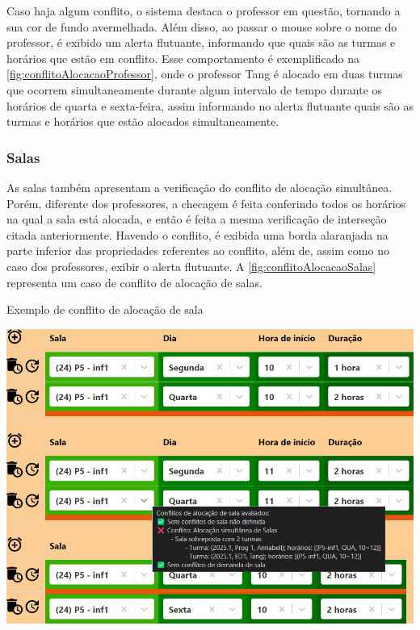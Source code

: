 Caso haja algum conflito, o sistema destaca o professor em questão, tornando a sua cor de fundo avermelhada. Além disso, ao passar o mouse sobre o nome do professor, é exibido um alerta flutuante, informando que quais são as turmas e horários que estão em conflito. Esse comportamento é exemplificado na \autoref{fig:conflitoAlocacaoProfessor}, onde o professor Tang é alocado em duas turmas que ocorrem simultaneamente durante algum intervalo de tempo durante os horários de quarta e sexta-feira, assim informando no alerta flutuante quais são as turmas e horários que estão alocados simultaneamente.

\subsubsection{Salas} \label{sssec:Salas}

As salas também apresentam a verificação do conflito de alocação simultânea. Porém, diferente dos professores, a checagem é feita conferindo todos os horários na qual a sala está alocada, e então é feita a mesma verificação de interseção citada anteriormente. Havendo o conflito, é exibida uma borda alaranjada na parte inferior das propriedades referentes ao conflito, além de, assim como no caso dos professores, exibir o alerta flutuante. A \autoref{fig:conflitoAlocacaoSalas} representa um caso de conflito de alocação de salas.

\begin{MyCenteredFigure} \caption{Exemplo de conflito de alocação de sala} \label{fig:conflitoAlocacaoSalas}
  \includegraphics[width=\textwidth]{files/img/2.02!5-desenvolvimento/2.02!5.1.5-conflitos/Alocação de Salas - Sala}
\end{MyCenteredFigure}

